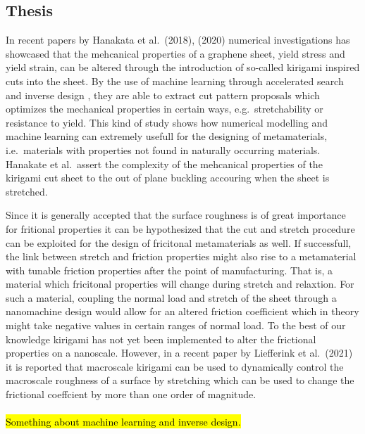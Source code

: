 \subsection{Thesis}
In recent papers by Hanakata et al.\ \cite{PhysRevLett.121.255304}(2018),
\cite{PhysRevResearch.2.042006}(2020) numerical investigations has showcased
that the mehcanical properties of a graphene sheet, yield stress and yield
strain, can be altered through the introduction of so-called kirigami inspired
cuts into the sheet. By the use of machine learning through accelerated search
\cite{PhysRevLett.121.255304} and inverse design
\cite{PhysRevResearch.2.042006}, they are able to extract cut pattern proposals
which optimizes the mechanical properties in certain ways, e.g.\ stretchability
or resistance to yield. This kind of study shows how numerical modelling and
machine learning can extremely usefull for the designing of metamaterials, i.e.\
materials with properties not found in naturally occurring materials. Hanakate
et al.\ assert the complexity of the mehcanical properties of the kirigami cut
sheet to the out of plane buckling accouring when the sheet is stretched. 

Since it is generally accepted that the surface roughness is of great importance
for fritional properties it can be hypothesized that the cut and stretch
procedure can be exploited for the design of fricitonal metamaterials as well.
If successfull, the link between stretch and friction properties might also rise
to a metamaterial with tunable friction properties after the point of
manufacturing. That is, a material which fricitonal properties will change
during stretch and relaxtion. For such a material, coupling the normal load and
stretch of the sheet through a nanomachine design would allow for an altered
friction coefficient which in theory might take negative values in certain
ranges of normal load. To the best of our knowledge kirigami has not yet been
implemented to alter the frictional properties on a nanoscale. However, in a
recent paper by Liefferink et al.\ \cite{LIEFFERINK2021101475}(2021) it is
reported that macroscale kirigami can be used to dynamically control the macroscale roughness of a surface by stretching which can be used to change the frictional coeffcient by more than one order of magnitude.
\\
\\
\hl{Something about machine learning and inverse design.}



